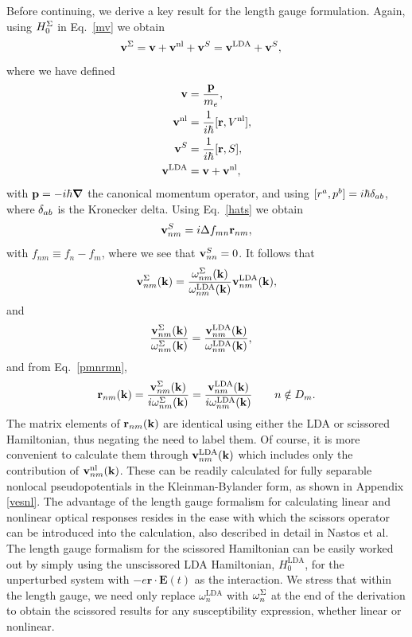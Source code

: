 \documentclass[floatfix,prb,aps,superscriptaddress,11pt,preprint,letterpaper]{revtex4}
\begin{document}
Before continuing,
we derive a key result for the length gauge formulation. 
Again, using $H^\Sigma_0$ in
Eq.~\eqref{mv} we obtain
\begin{align}\label{vop2}
\mathbf{v}^\Sigma&=
\mathbf{v} 
+
\mathbf{v}^{\mathrm{nl}} 
+\mathbf{v}^S
=
\mathbf{v}^{\mathrm{LDA}} 
+\mathbf{v}^S 
,
\end{align}
where we have defined 
\begin{subequations}
\begin{align}\label{ve}
\mathbf{v} 
&=\frac{\mathbf{p}}{m_e},
\\\label{vnl}
\mathbf{v}^{\mathrm{nl}} 
&=
\frac{1}{i\hbar}[\mathbf{r},V^{\mathrm{nl}}],
\\\label{vs}
\mathbf{v}^S
&=
\frac{1}{i\hbar}[\mathbf{r}, S],
\\\label{vlda}
\mathbf{v}^{\mathrm{LDA}} 
&=
\mathbf{v} 
+\mathbf{v}^{\mathrm{nl}}
,
\end{align}  
\end{subequations}
with $\mathbf{p}=-i\hbar\boldsymbol{\nabla}$ the canonical momentum operator, 
and using $[r^a,p^b]=i\hbar\delta_{ab}$, where $\delta_{ab}$ is the Kronecker delta.
Using Eq.~\eqref{hats} we obtain 
\begin{equation}\label{chon.2} 
\mathbf{v}^S_{nm}=i\Delta f_{mn}\mathbf{r}_{nm},
\end{equation}
with $f_{nm}\equiv f_n-f_m$,
where we see that $\mathbf{v}^S_{nn}=0$. It follows that
\begin{align}\label{chon.9}
\mathbf{v}^\Sigma_{nm}(\mathbf{k}) 
=\frac{\omega^\Sigma_{nm}(\mathbf{k})}{\omega^{\mathrm{LDA}}_{nm}(\mathbf{k})}
\mathbf{v}^{\mathrm{LDA}}_{nm}(\mathbf{k}) 
,
\end{align}
and
 \begin{align}\label{chon.8}
\frac{\mathbf{v}^\Sigma_{nm}(\mathbf{k})}{\omega^\Sigma_{nm}(\mathbf{k})}
&=
\frac{\mathbf{v}^{\mathrm{LDA}}_{nm}(\mathbf{k})}{\omega^{\mathrm{LDA}}_{nm}(\mathbf{k})}
,
\end{align}
and from Eq.~\eqref{pmnrmn},
\begin{align}\label{chon.10}
\mathbf{r}_{nm}(\mathbf{k}) 
=
\frac{\mathbf{v}^\Sigma_{nm}(\mathbf{k})}{i\omega^\Sigma_{nm}(\mathbf{k})}
=
\frac{\mathbf{v}^{\mathrm{LDA}}_{nm}(\mathbf{k})}{i\omega^{\mathrm{LDA}}_{nm}(\mathbf{k})}
\quad\quad n\notin D_m 
. 
\end{align}
The matrix elements 
of $\mathbf{r}_{nm}(\mathbf{k})$ are identical using either
the LDA or scissored
Hamiltonian, thus negating the need to label them.
Of course, it is more convenient to calculate them
through $\mathbf{v}^{\mathrm{LDA}}_{nm}(\mathbf{k})$ which 
includes only the contribution of 
$\mathbf{v}^{\mathrm{nl}}_{nm}(\mathbf{k})$. These can be readily
calculated
for 
fully separable nonlocal pseudopotentials in the 
Kleinman-Bylander 
form,\cite{francesco,mottaCMS10,kleinmanPRL82,adolphPRB96}
as shown in Appendix \ref{vesnl}.
The advantage of the length gauge formalism for 
calculating linear and nonlinear optical responses 
resides in the ease with which the scissors operator
can be introduced into the calculation, also described in detail in
Nastos et al.\cite{nastosPRB05} The 
length gauge formalism for the scissored Hamiltonian can be easily worked 
out by simply using the unscissored LDA Hamiltonian,
$H_0^{\mathrm{LDA}}$,
for the unperturbed system 
with $-e\mathbf{r}\cdot \mathbf{E}(t)$ as the interaction. 
We stress that within the length gauge,
we need only replace $\omega^{\mathrm{LDA}}_{n}$ with 
$\omega_{n}^{\Sigma}$ at the end of the derivation
to obtain the scissored results for any 
susceptibility expression, whether linear or nonlinear. 
\end{document}
